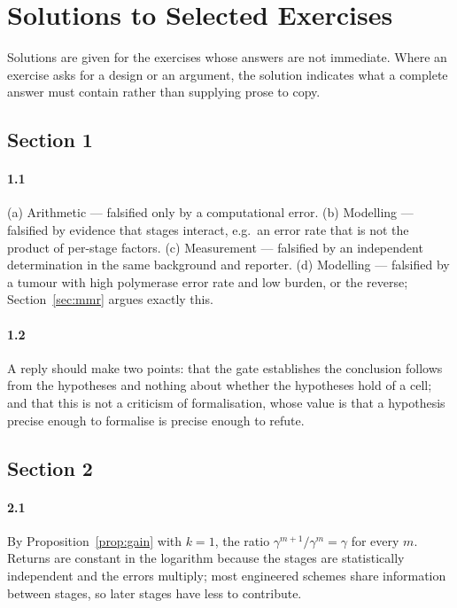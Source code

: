 \section{Solutions to Selected Exercises}\label{app:solutions}

Solutions are given for the exercises whose answers are not immediate. Where an
exercise asks for a design or an argument, the solution indicates what a complete
answer must contain rather than supplying prose to copy.

\subsection*{Section 1}

\paragraph{1.1}
(a) Arithmetic --- falsified only by a computational error.
(b) Modelling --- falsified by evidence that stages interact, e.g.\ an error rate
that is not the product of per-stage factors.
(c) Measurement --- falsified by an independent determination in the same
background and reporter.
(d) Modelling --- falsified by a tumour with high polymerase error rate and low
burden, or the reverse; Section~\ref{sec:mmr} argues exactly this.

\paragraph{1.2}
A reply should make two points: that the gate establishes the conclusion follows
from the hypotheses and nothing about whether the hypotheses hold of a cell; and
that this is not a criticism of formalisation, whose value is that a hypothesis
precise enough to formalise is precise enough to refute.

\subsection*{Section 2}

\paragraph{2.1}
By Proposition~\ref{prop:gain} with $k = 1$, the ratio
$\gamma^{m+1}/\gamma^{m} = \gamma$ for every $m$. Returns are constant in the
logarithm because the stages are statistically independent and the errors
multiply; most engineered schemes share information between stages, so later
stages have less to contribute.

